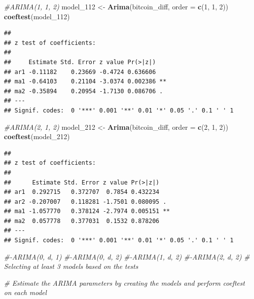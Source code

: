 \documentclass[
]{book}
\newenvironment{Shaded}{\begin{snugshade}}{\end{snugshade}}
\newcommand{\AttributeTok}[1]{\textcolor[rgb]{0.13,0.29,0.53}{#1}}
\newcommand{\CommentTok}[1]{\textcolor[rgb]{0.56,0.35,0.01}{\textit{#1}}}
\newcommand{\DecValTok}[1]{\textcolor[rgb]{0.00,0.00,0.81}{#1}}
\newcommand{\FunctionTok}[1]{\textcolor[rgb]{0.13,0.29,0.53}{\textbf{#1}}}
\newcommand{\NormalTok}[1]{#1}
\newcommand{\OtherTok}[1]{\textcolor[rgb]{0.56,0.35,0.01}{#1}}
\begin{document}
\begin{Shaded}
\begin{Highlighting}[]
\CommentTok{\#ARIMA(1, 1, 2)}
\NormalTok{model\_112 }\OtherTok{\textless{}{-}} \FunctionTok{Arima}\NormalTok{(bitcoin\_diff, }\AttributeTok{order =} \FunctionTok{c}\NormalTok{(}\DecValTok{1}\NormalTok{, }\DecValTok{1}\NormalTok{, }\DecValTok{2}\NormalTok{))}
\FunctionTok{coeftest}\NormalTok{(model\_112)}
\end{Highlighting}
\end{Shaded}

\begin{verbatim}
## 
## z test of coefficients:
## 
##     Estimate Std. Error z value Pr(>|z|)   
## ar1 -0.11182    0.23669 -0.4724 0.636606   
## ma1 -0.64103    0.21104 -3.0374 0.002386 **
## ma2 -0.35894    0.20954 -1.7130 0.086706 . 
## ---
## Signif. codes:  0 '***' 0.001 '**' 0.01 '*' 0.05 '.' 0.1 ' ' 1
\end{verbatim}

\begin{Shaded}
\begin{Highlighting}[]
\CommentTok{\#ARIMA(2, 1, 2)}
\NormalTok{model\_212 }\OtherTok{\textless{}{-}} \FunctionTok{Arima}\NormalTok{(bitcoin\_diff, }\AttributeTok{order =} \FunctionTok{c}\NormalTok{(}\DecValTok{2}\NormalTok{, }\DecValTok{1}\NormalTok{, }\DecValTok{2}\NormalTok{))}
\FunctionTok{coeftest}\NormalTok{(model\_212)}
\end{Highlighting}
\end{Shaded}

\begin{verbatim}
## 
## z test of coefficients:
## 
##      Estimate Std. Error z value Pr(>|z|)   
## ar1  0.292715   0.372707  0.7854 0.432234   
## ar2 -0.207007   0.118281 -1.7501 0.080095 . 
## ma1 -1.057770   0.378124 -2.7974 0.005151 **
## ma2  0.057778   0.377031  0.1532 0.878206   
## ---
## Signif. codes:  0 '***' 0.001 '**' 0.01 '*' 0.05 '.' 0.1 ' ' 1
\end{verbatim}

\begin{Shaded}
\begin{Highlighting}[]
\CommentTok{\#{-}ARIMA(0, d, 1)}
\CommentTok{\#{-}ARIMA(0, d, 2)}
\CommentTok{\#{-}ARIMA(1, d, 2)}
\CommentTok{\#{-}ARIMA(2, d, 2)}
\CommentTok{\# Selecting at least 3 models based on the tests}


\CommentTok{\# Estimate the ARIMA parameters by creating the models and perform coeftest on each model}
\end{Highlighting}
\end{Shaded}
\end{document}
